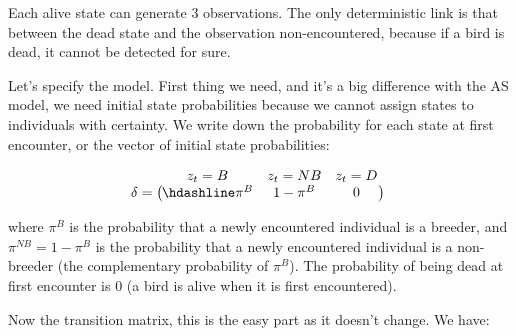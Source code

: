 \documentclass[
  12pt,
]{krantz}
\begin{document}
Each alive state can generate 3 observations. The only deterministic link is that between the dead state and the observation non-encountered, because if a bird is dead, it cannot be detected for sure.

Let's specify the model. First thing we need, and it's a big difference with the AS model, we need initial state probabilities because we cannot assign states to individuals with certainty. We write down the probability for each state at first encounter, or the vector of initial state probabilities:

\[\begin{matrix}
& \\
\mathbf{\delta} =
    \left ( \vphantom{ \begin{matrix} 12 \end{matrix} } \right .
\end{matrix}
\hspace{-1.2em}
\begin{matrix}
    z_t=B & z_t=NB & z_t=D \\ \hdashline
\pi^B & 1 - \pi^{B} & 0\\
\end{matrix}
\hspace{-0.2em}
\begin{matrix}
& \\
\left . \vphantom{ \begin{matrix} 12 \end{matrix} } \right )
    \begin{matrix}
    \end{matrix}
\end{matrix}\]

where \(\pi^B\) is the probability that a newly encountered individual is a breeder, and \(\pi^{NB} = 1 - \pi^B\) is the probability that a newly encountered individual is a non-breeder (the complementary probability of \(\pi^B\)). The probability of being dead at first encounter is 0 (a bird is alive when it is first encountered).

Now the transition matrix, this is the easy part as it doesn't change. We have:
\end{document}
